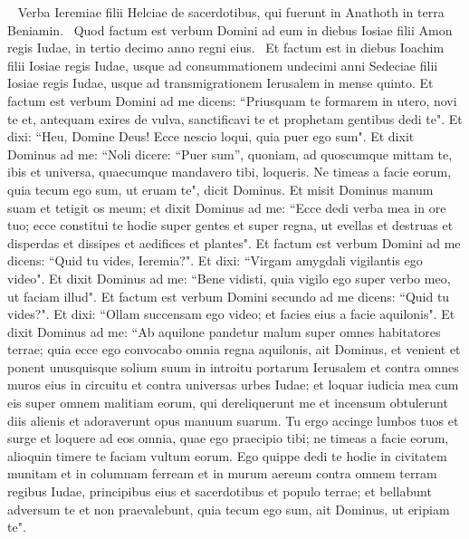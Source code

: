 
\begin{biblechapter}   
\verse Verba Ieremiae filii Helciae de sacerdotibus, qui fuerunt in Anathoth in terra Beniamin.  
\verse Quod factum est verbum Domini ad eum in diebus Iosiae filii Amon regis Iudae, in tertio decimo anno regni eius.  
\verse Et factum est in diebus Ioachim filii Iosiae regis Iudae, usque ad consummationem undecimi anni Sedeciae filii Iosiae regis Iudae, usque ad transmigrationem Ierusalem in mense quinto. 
\verse Et factum est verbum Domini ad me dicens: 
\verse “Priusquam te formarem in utero, novi te et, antequam exires de vulva, sanctificavi te et prophetam gentibus dedi te". 
\verse Et dixi: “Heu, Domine Deus! Ecce nescio loqui, quia puer ego sum". 
\verse Et dixit Dominus ad me: “Noli dicere: “Puer sum”, quoniam, ad quoscumque mittam te, ibis et universa, quaecumque mandavero tibi, loqueris. 
\verse Ne timeas a facie eorum, quia tecum ego sum, ut eruam te", dicit Dominus. 
\verse Et misit Dominus manum suam et tetigit os meum; et dixit Dominus ad me: “Ecce dedi verba mea in ore tuo; 
\verse ecce constitui te hodie super gentes et super regna, ut evellas et destruas et disperdas et dissipes et aedifices et plantes". 
\verse Et factum est verbum Domini ad me dicens: “Quid tu vides, Ieremia?". Et dixi: “Virgam amygdali vigilantis ego video". 
\verse Et dixit Dominus ad me: “Bene vidisti, quia vigilo ego super verbo meo, ut faciam illud". 
\verse Et factum est verbum Domini secundo ad me dicens: “Quid tu vides?". Et dixi: “Ollam succensam ego video; et facies eius a facie aquilonis". 
\verse Et dixit Dominus ad me: “Ab aquilone pandetur malum super omnes habitatores terrae; 
\verse quia ecce ego convocabo omnia regna aquilonis, ait Dominus, et venient et ponent unusquisque solium suum in introitu portarum Ierusalem et contra omnes muros eius in circuitu et contra universas urbes Iudae; 
\verse et loquar iudicia mea cum eis super omnem malitiam eorum, qui dereliquerunt me et incensum obtulerunt diis alienis et adoraverunt opus manuum suarum. 
\verse Tu ergo accinge lumbos tuos et surge et loquere ad eos omnia, quae ego praecipio tibi; ne timeas a facie eorum, alioquin timere te faciam vultum eorum. 
\verse Ego quippe dedi te hodie in civitatem munitam et in columnam ferream et in murum aereum contra omnem terram regibus Iudae, principibus eius et sacerdotibus et populo terrae; 
\verse et bellabunt adversum te et non praevalebunt, quia tecum ego sum, ait Dominus, ut eripiam te". 
\end{biblechapter}

